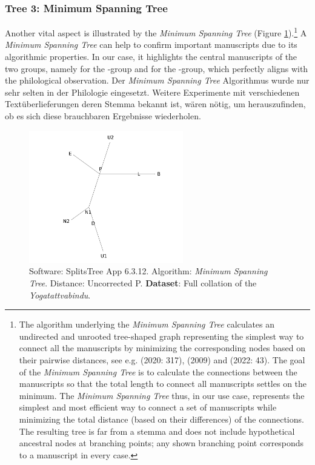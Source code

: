 \subsubsection{Tree 3: Minimum Spanning Tree}

Another vital aspect is illustrated by the \textit{Minimum Spanning Tree} (Figure \ref{fig:tree-minspan}).\footnote{The algorithm underlying the \textit{Minimum Spanning Tree} calculates an undirected and unrooted tree-shaped graph representing the simplest way to connect all the manuscripts by minimizing the corresponding nodes based on their pairwise distances, see e.g. \citeauthor{stemmamethods} (2020: 317), \citeauthor{cormen2009introduction} (2009) and \citeauthor{huson2022} (2022: 43). The goal of the \textit{Minimum Spanning Tree} is to calculate the connections between the manuscripts so that the total length to connect all manuscripts settles on the minimum. The \textit{Minimum Spanning Tree} thus, in our use case, represents the simplest and most efficient way to connect a set of manuscripts while minimizing the total distance (based on their differences) of the connections. The resulting tree is far from a stemma and does not include hypothetical ancestral nodes at branching points; any shown branching point corresponds to a manuscript in every case.} A \textit{Minimum Spanning Tree} can help to confirm important manuscripts due to its algorithmic properties. In our case, it highlights the central manuscripts of the two groups, namely  for the \alpha-group and  for the \beta-group, which perfectly aligns with the philological observation. Der \textit{Minimum Spanning Tree} Algorithmus wurde nur sehr selten in der Philologie eingesetzt. Weitere Experimente mit verschiedenen Textüberlieferungen deren Stemma bekannt ist, wären nötig, um herauszufinden, ob es sich diese brauchbaren Ergebnisse wiederholen.  

  \begin{figure}[H]
    \centering
    \includegraphics[width=0.6\textwidth]{pics/tree-minspan.png} %
    \caption{Software: SplitsTree App 6.3.12. Algorithm: \textit{Minimum Spanning Tree}. Distance: Uncorrected P. \textbf{Dataset}: Full collation of the \emph{Yogatattvabindu}.}
    \label{fig:tree-minspan}
\end{figure}

